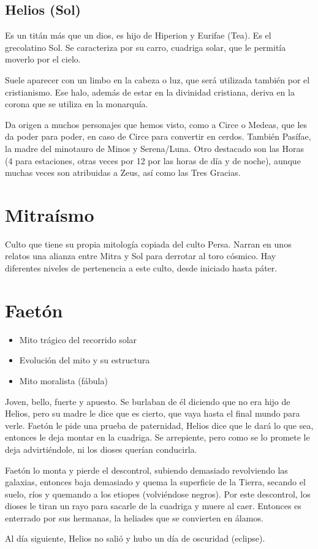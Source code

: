 \subsection{Helios (Sol)}
Es un titán más que un dios, es hijo de Hiperion y Eurifae (Tea). Es el grecolatino Sol. Se caracteriza por su carro, cuadriga solar, que le permitía moverlo por el cielo.

Suele aparecer con un limbo en la cabeza o luz, que será utilizada también por el cristianismo. Ese halo, además de estar en la divinidad cristiana, deriva en la corona que se utiliza en la monarquía.

Da origen a muchos personajes que hemos visto, como a Circe o Medeas, que les da poder para poder, en caso de Circe para convertir en cerdos. También Pasífae, la madre del minotauro de Minos y Serena/Luna. Otro destacado son las Horas (4 para estaciones, otras veces por 12 por las horas de día y de noche), aunque muchas veces son atribuidas a Zeus, así como las Tres Gracias.

\section{Mitraísmo}
Culto que tiene su propia mitología copiada del culto Persa. Narran en unos relatos una alianza entre Mitra y Sol para derrotar al toro cósmico. Hay diferentes niveles de pertenencia a este culto, desde iniciado hasta páter.

\section{Faetón}
\begin{itemize}
	\item Mito trágico del recorrido solar
	\item Evolución del mito y su estructura
	\item Mito moralista (fábula)
\end{itemize}
Joven, bello, fuerte y apuesto. Se burlaban de él diciendo que no era hijo de Helios, pero su madre le dice que es cierto, que vaya hasta el final mundo para verle. Faetón le pide una prueba de paternidad, Helios dice que le dará lo que sea, entonces le deja montar en la cuadriga. Se arrepiente, pero como se lo promete le deja advirtiéndole, ni los dioses querían conducirla.

Faetón lo monta y pierde el descontrol, subiendo demasiado revolviendo las galaxias, entonces baja demasiado y quema la superficie de la Tierra, secando el suelo, ríos y quemando a los etiopes (volviéndose negros). Por este descontrol, los dioses le tiran un rayo para sacarle de la cuadriga y muere al caer. Entonces es enterrado por sus hermanas, la heliades  que se convierten en álamos.

Al día siguiente, Helios no salió y hubo un día de oscuridad (eclipse).